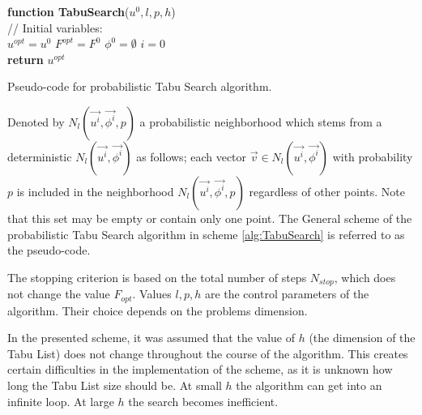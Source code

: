 \documentclass[]{TAACpaper}
\begin{document}
\begin{algorithm}[H]
	\textbf{function TabuSearch}($u^0,l,p,h$) \\
	// Initial variables:	\\
	$u^{opt} = u^0$
	$F^{opt} = F^0$
	$\phi^{0} =  \emptyset$
	$i=0$ \\
	\textbf{return} $u^{opt}$
	
\caption{Pseudo-code for probabilistic Tabu Search algorithm.}
\label{alg:TabuSearch}
\end{algorithm}

Denoted by $N_l(\vec{u^i},\vec{\phi^i},p)$ a probabilistic neighborhood which stems from a deterministic $N_l(\vec{u^i},\vec{\phi^i})$ as follows; each vector $\vec{v} \in N_l(\vec{u^i},\vec{\phi^i})$ with probability $p$ is included in the neighborhood $N_l(\vec{u^i},\vec{\phi^i},p)$ regardless of other points. Note that this set may be empty or contain only one point. The General scheme of the probabilistic Tabu Search algorithm in scheme \ref{alg:TabuSearch} is referred to as the pseudo-code.

The stopping criterion is based on the total number of steps $N_{stop}$, which does not change the value $F_{opt}$. Values $l,p,h$ are the control parameters of the algorithm. Their choice depends on the problems dimension.

In the presented scheme, it was assumed that the value of $h$ (the dimension of the Tabu List) does not change throughout the course of the algorithm. This creates certain difficulties in the implementation of the scheme, as it is unknown how long the Tabu List size should be. At small $h$ the algorithm can get into an infinite loop. At large $h$ the search becomes inefficient.
\end{document}
